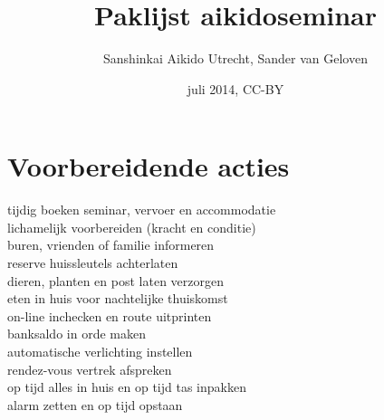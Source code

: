 \documentclass[9pt,twocolumn]{memoir}
\begin{document}
\title{\Huge\bfseries Paklijst aikidoseminar}
\author{Sanshinkai Aikido Utrecht, Sander van Geloven}
\date{juli 2014, CC-BY}
\maketitle

\section*{Voorbereidende acties}%
tijdig boeken seminar, vervoer en accommodatie\\%
lichamelijk voorbereiden (kracht en conditie)\\%
buren, vrienden of familie informeren\\%
reserve huissleutels achterlaten\\%
dieren, planten en post laten verzorgen\\%
eten in huis voor nachtelijke thuiskomst\\%
on-line inchecken en route uitprinten\\%
banksaldo in orde maken\\%
automatische verlichting instellen\\%
rendez-vous vertrek afspreken\\%
op tijd alles in huis en op tijd tas inpakken\\%
alarm zetten en op tijd opstaan%
\end{document}
